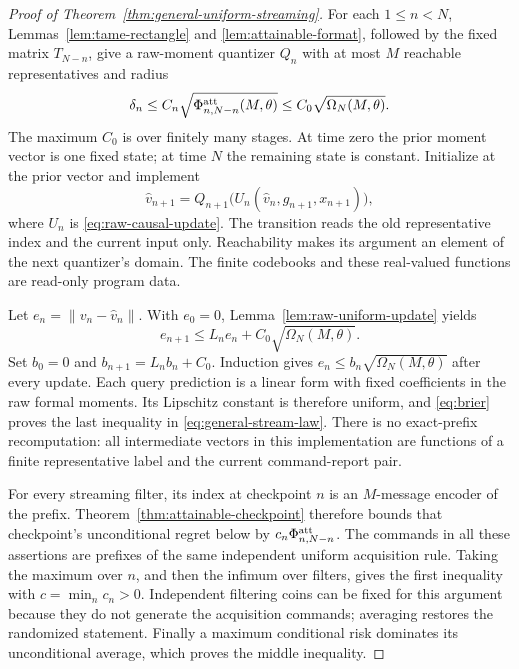 \documentclass[11pt]{amsart}
\theoremstyle{definition}\newtheorem{definition}[theorem]{Definition}
\theoremstyle{remark}\newtheorem{remark}[theorem]{Remark}
\begin{document}
\begin{proof}[Proof of Theorem~\ref{thm:general-uniform-streaming}]
For each $1\le n<N$, Lemmas~\ref{lem:tame-rectangle} and
\ref{lem:attainable-format}, followed by the fixed matrix $T_{N-n}$,
give a raw-moment quantizer $Q_n$ with at most $M$ reachable
representatives and radius
\[
 \delta_n\le C_n\sqrt{\Phi^{\rm att}_{n,N-n}(M,\theta)}
             \le C_0\sqrt{\Omega_N(M,\theta)}.
\]
The maximum $C_0$ is over finitely many stages. At time zero the prior
moment vector is one fixed state; at time $N$ the remaining state is
constant. Initialize at the prior vector and implement
\[
 \widehat v_{n+1}=Q_{n+1}
       \bigl(U_n(\widehat v_n,g_{n+1},x_{n+1})\bigr),
\]
where $U_n$ is \eqref{eq:raw-causal-update}. The transition reads the
old representative index and the current input only. Reachability makes
its argument an element of the next quantizer's domain. The finite
codebooks and these real-valued functions are read-only program data.

Let $e_n=\|v_n-\widehat v_n\|$. With $e_0=0$,
Lemma~\ref{lem:raw-uniform-update} yields
\[
 e_{n+1}\le L_ne_n+C_0\sqrt{\Omega_N(M,\theta)}.
\]
Set $b_0=0$ and $b_{n+1}=L_nb_n+C_0$. Induction gives
$e_n\le b_n\sqrt{\Omega_N(M,\theta)}$ after every update.
Each query prediction is a linear form with fixed coefficients in the
raw formal moments. Its Lipschitz constant is therefore uniform, and
\eqref{eq:brier} proves the last inequality in
\eqref{eq:general-stream-law}. There is no exact-prefix recomputation:
all intermediate vectors in this implementation are functions of a finite
representative label and the current command-report pair.

For every streaming filter, its index at checkpoint $n$ is an
$M$-message encoder of the prefix. Theorem~\ref{thm:attainable-checkpoint}
therefore bounds that checkpoint's unconditional regret below by
$c_n\Phi^{\rm att}_{n,N-n}$. The commands in all these assertions
are prefixes of the same independent uniform acquisition rule. Taking
the maximum over $n$, and then the infimum over filters, gives the
first inequality with $c=\min_n c_n>0$. Independent filtering coins
can be fixed for this argument because they do not generate the
acquisition commands; averaging restores the randomized statement.
Finally a maximum conditional risk dominates its unconditional average,
which proves the middle inequality.
\end{proof}
\end{document}
